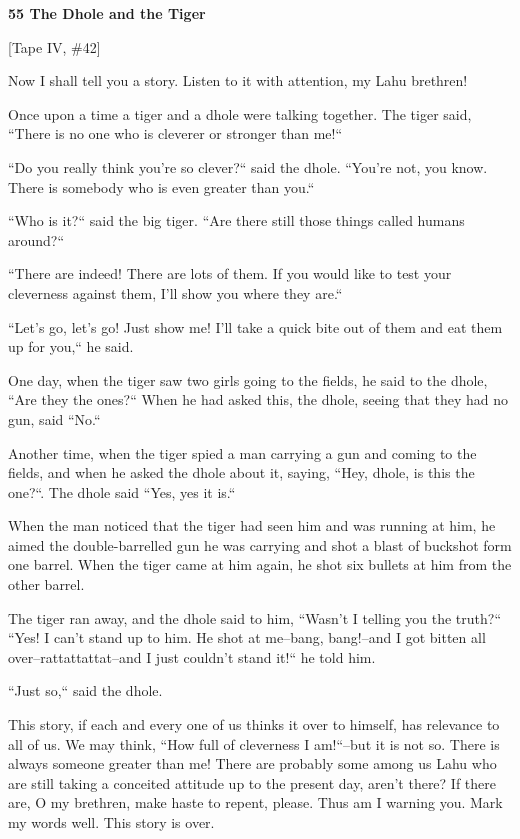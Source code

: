 
\textbf{55 The Dhole and the Tiger}

[Tape IV, \#42]

Now I shall tell you a story. Listen to it with attention, my Lahu brethren!

Once upon a time a tiger and a dhole were talking together. The tiger said, ``There
is no one who is cleverer or stronger than me!``

``Do you really think you're so clever?`` said the dhole. ``You're
not, you know. There is somebody who is even greater than you.``

``Who is it?`` said the big tiger. ``Are there still those
things called humans around?``

``There are indeed! There are lots of them. If you would like to test your
cleverness against them, I'll show you where they are.``

``Let's go, let's go! Just show me! I'll take a quick bite out of them
and eat them up for you,`` he said.

One day, when the tiger saw two girls going to the fields, he said to the dhole,
``Are they the ones?`` When he had asked this, the dhole, seeing
that they had no gun, said ``No.``

Another time, when the tiger spied a man carrying a gun and coming to the fields,
and when he asked the dhole about it, saying, ``Hey, dhole, is this the
one?``. The dhole said ``Yes, yes it is.``

When the man noticed that the tiger had seen him and was running at him, he aimed
the double-barrelled gun he was carrying and shot a blast of buckshot form one
barrel. When the tiger came at him again, he shot six bullets at him from the other
barrel.

The tiger ran away, and the dhole said to him, ``Wasn't I telling you the
truth?`` ``Yes! I can't stand up to him. He shot at me--bang, bang!--and
I got bitten all over--rattattattat--and I just couldn't stand it!`` he
told him.

``Just so,`` said the dhole.

This story, if each and every one of us thinks it over to himself, has relevance
to all of us. We may think, ``How full of cleverness I am!``--but
it is not so. There is always someone greater than me! There are probably some
among us Lahu who are still taking a conceited attitude up to the present day,
aren't there? If there are, O my brethren, make haste to repent, please. Thus am
I warning you. Mark my words well. This story is over.


